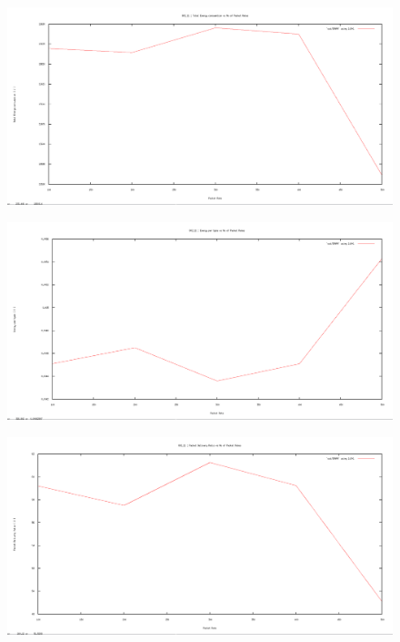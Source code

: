 \documentclass[12pt]{article}
\begin{document}
\begin{figure}[H]
	\centering
	\includegraphics[scale=	0.26]{image/802.11/Energyconsumption_vs_packetRates.png}
\end{figure}

\begin{figure}[H]
	\centering
	\includegraphics[scale=	0.26]{image/802.11/Energyperbytes_vs_packetRates.png}
\end{figure}

\begin{figure}[H]
	\centering
	\includegraphics[scale=	0.26]{image/802.11/Packetdeliveryratio_vs_packetRates.png}
\end{figure}
\end{document}
